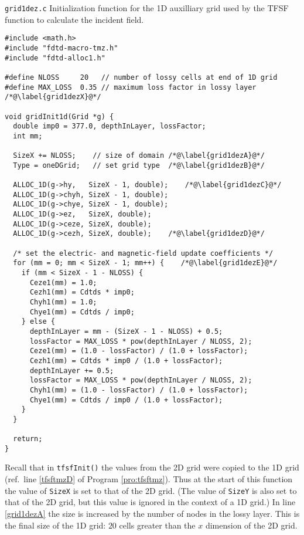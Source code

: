 \begin{program}
{\tt grid1dez.c}
Initialization function for the 1D auxilliary grid used by the TFSF
function to calculate the incident field.
\label{pro:grid1dez}
\codemiddle
\begin{lstlisting}
#include <math.h>
#include "fdtd-macro-tmz.h"
#include "fdtd-alloc1.h"

#define NLOSS     20   // number of lossy cells at end of 1D grid
#define MAX_LOSS  0.35 // maximum loss factor in lossy layer /*@\label{grid1dezX}@*/

void gridInit1d(Grid *g) {
  double imp0 = 377.0, depthInLayer, lossFactor;
  int mm;

  SizeX += NLOSS;    // size of domain /*@\label{grid1dezA}@*/
  Type = oneDGrid;   // set grid type  /*@\label{grid1dezB}@*/

  ALLOC_1D(g->hy,   SizeX - 1, double);    /*@\label{grid1dezC}@*/
  ALLOC_1D(g->chyh, SizeX - 1, double);
  ALLOC_1D(g->chye, SizeX - 1, double);
  ALLOC_1D(g->ez,   SizeX, double);
  ALLOC_1D(g->ceze, SizeX, double);
  ALLOC_1D(g->cezh, SizeX, double);    /*@\label{grid1dezD}@*/
  
  /* set the electric- and magnetic-field update coefficients */
  for (mm = 0; mm < SizeX - 1; mm++) {    /*@\label{grid1dezE}@*/
    if (mm < SizeX - 1 - NLOSS) {
      Ceze1(mm) = 1.0;
      Cezh1(mm) = Cdtds * imp0;
      Chyh1(mm) = 1.0;
      Chye1(mm) = Cdtds / imp0;
    } else {
      depthInLayer = mm - (SizeX - 1 - NLOSS) + 0.5;
      lossFactor = MAX_LOSS * pow(depthInLayer / NLOSS, 2);
      Ceze1(mm) = (1.0 - lossFactor) / (1.0 + lossFactor);
      Cezh1(mm) = Cdtds * imp0 / (1.0 + lossFactor);
      depthInLayer += 0.5;
      lossFactor = MAX_LOSS * pow(depthInLayer / NLOSS, 2);
      Chyh1(mm) = (1.0 - lossFactor) / (1.0 + lossFactor);
      Chye1(mm) = Cdtds / imp0 / (1.0 + lossFactor);
    }
  }

  return;
}
\end{lstlisting}
\end{program}

Recall that in {\tt tfsfInit()} the values from the 2D grid were
copied to the 1D grid (ref.\ line \ref{tfsftmzD} of Program
\ref{pro:tfsftmz}).  Thus at the start of this function the value of
{\tt SizeX} is set to that of the 2D grid.  (The value of {\tt SizeY}
is also set to that of the 2D grid, but this value is ignored in the
context of a 1D grid.)  In line \ref{grid1dezA} the size is increased by
the number of nodes in the lossy layer.  This is the final size of the
1D grid: $20$ cells greater than the $x$ dimension of the 2D grid.

